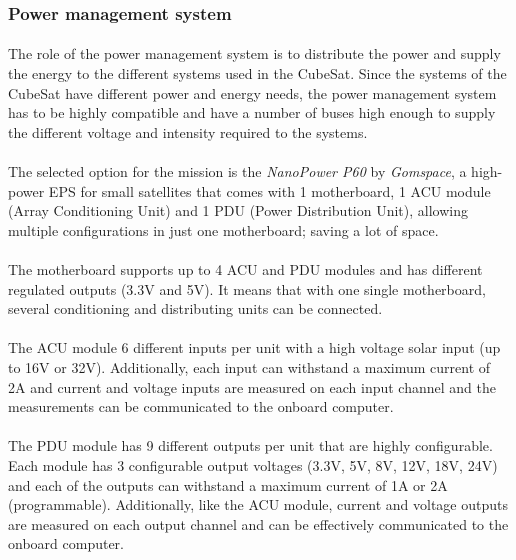\subsubsection{Power management system}

\paragraph{}The role of the power management system is to distribute the power and supply the energy to the different systems used in the CubeSat. Since the systems of the CubeSat have different power and energy needs, the power management system has to be highly compatible and have a number of buses high enough to supply the different voltage and intensity required to the systems.

\paragraph{}The selected option for the mission is the \textit{NanoPower P60} by \textit{Gomspace}, a high-power EPS for small satellites that comes with 1 motherboard, 1 ACU module (Array Conditioning Unit) and 1 PDU (Power Distribution Unit), allowing multiple configurations in just one motherboard; saving a lot of space.

\paragraph{}The motherboard supports up to 4 ACU and PDU modules and has different regulated outputs (3.3V and 5V). It means that with one single motherboard, several conditioning and distributing units can be connected.

\paragraph{}The ACU module 6 different inputs per unit with a high voltage solar input (up to 16V or 32V). Additionally, each input can withstand a maximum current of 2A and current and voltage inputs are measured on each input channel and the measurements can be communicated to the onboard computer.

\paragraph{}The PDU module has 9 different outputs per unit that are highly configurable. Each module has 3 configurable output voltages (3.3V, 5V, 8V, 12V, 18V, 24V) and each of the outputs can withstand a maximum current of 1A or 2A (programmable). Additionally, like the ACU module, current and voltage outputs are measured on each output channel and can be effectively communicated to the onboard computer.

